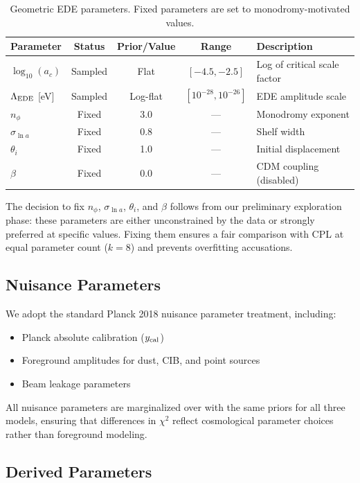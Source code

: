 \documentclass[a4paper,11pt]{article}
\begin{document}
\begin{table}[h]
\centering
\caption{Geometric EDE parameters. Fixed parameters are set to monodromy-motivated values.}
\label{tab:ede_priors}
\begin{tabular}{lcccl}
\toprule
Parameter & Status & Prior/Value & Range & Description \\
\midrule
$\log_{10}(a_c)$ & Sampled & Flat & $[-4.5, -2.5]$ & Log of critical scale factor \\
$\Lambda_{\rm EDE}$ [eV] & Sampled & Log-flat & $[10^{-28}, 10^{-26}]$ & EDE amplitude scale \\
\midrule
$n_\phi$ & Fixed & 3.0 & --- & Monodromy exponent \\
$\sigma_{\ln a}$ & Fixed & 0.8 & --- & Shelf width \\
$\theta_i$ & Fixed & 1.0 & --- & Initial displacement \\
$\beta$ & Fixed & 0.0 & --- & CDM coupling (disabled) \\
\bottomrule
\end{tabular}
\end{table}

The decision to fix $n_\phi$, $\sigma_{\ln a}$, $\theta_i$, and $\beta$ follows from our preliminary exploration phase: these parameters are either unconstrained by the data or strongly preferred at specific values. Fixing them ensures a fair comparison with CPL at equal parameter count ($k=8$) and prevents overfitting accusations.

\subsection{Nuisance Parameters}

We adopt the standard Planck 2018 nuisance parameter treatment, including:
\begin{itemize}
    \item Planck absolute calibration ($y_{\rm cal}$)
    \item Foreground amplitudes for dust, CIB, and point sources
    \item Beam leakage parameters
\end{itemize}

All nuisance parameters are marginalized over with the same priors for all three models, ensuring that differences in $\chi^2$ reflect cosmological parameter choices rather than foreground modeling.

\subsection{Derived Parameters}
\end{document}
